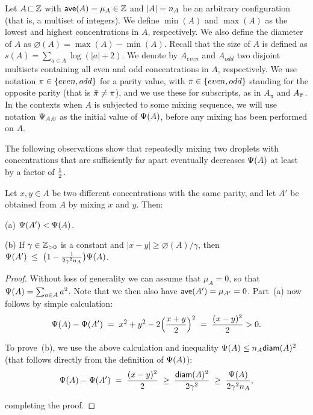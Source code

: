 
Let $A{\,\sqsubset\,}{\mathbb Z}$ with ${\textsf{ave}}(A)=\mu_A\in{\mathbb Z}$ and 
${|A|}=n_A$ be an arbitrary configuration (that is, a multiset of integers).
We define $\min(A)$ and $\max(A)$ as the lowest and highest concentrations in $A$, respectively.
We also define the diameter of $A$ as $\diameter(A) = \max(A) - \min(A)$.
Recall that the size of $A$ is defined as $s(A)=\sum_{a\in A} \log(|a|+2)$. 
We denote by $A_{even}$ and $A_{odd}$ two disjoint multisets containing
all even and odd concentrations in $A$, respectively.
We use notation $\pi\in{ \left\{ even,odd \right\} }$ for a parity value, with
${\bar{\pi}}\in{ \left\{ even,odd \right\} }$ standing for the opposite parity (that is ${\bar{\pi}}\neq\pi$),
and we use these for subscripts, as in  $A_\pi$ and $A_{{\bar{\pi}}}$.   
In the contexts when $A$ is subjected to some mixing sequence,
we will use notation ${\Psi}_{A,0}$ as the initial value of ${\Psi}(A)$,
before any mixing has been performed on $A$.

The following observations show that repeatedly mixing two droplets with concentrations 
that are sufficiently far apart eventually decreases ${\Psi}(A)$ at least by a factor of ${\textstyle\frac{1}{2}}$.


\begin{observation}\label{obs: far-appart mix}
Let $x,y\in A$ be two different concentrations with the same parity, and let $A'$ be
obtained from $A$ by mixing $x$ and $y$. Then:
%
\begin{description}
	
	\item{(a)} ${\Psi}(A') < {\Psi}(A)$.

	\item{(b)} If $\gamma\in{\mathbb{Z}_{> 0}}$ is a constant and
	$|x-y|\geq\diameter(A)/\gamma$, then
	${\Psi}(A') \;\leq\; \big(1 - \frac{1}{2\gamma^2n_A} \big){\Psi}(A)$.
	
\end{description}

\end{observation}

\begin{proof}
Without loss of generality we can assume that $\mu_A= 0$, so that ${\Psi}(A)=\sum_{a\in A}a^2$.
Note that we then also have ${\textsf{ave}}(A')=\mu_{A'} = 0$.
Part~(a) now follows by simple calculation:
%
	\begin{equation*}
			{\Psi}(A) - {\Psi}(A')
			\;=\; x^2+y^2-2\Big(\frac{x+y}{2}\Big)^2 
			\;=\; \frac{(x-y)^2}{2} > 0.
	\end{equation*}

\noindent
To prove~(b), we use the above calculation and inequality ${\Psi}(A)\le n_A {\textsf{diam}}(A)^2$
(that follows directly from the definition of ${\Psi}(A)$):
%
	\begin{equation*}
			{\Psi}(A) - {\Psi}(A')
			\;=\; \frac{(x-y)^2}{2} 
			\;\geq\; \frac{{\textsf{diam}}(A)^2}{2\gamma^2} 
			\;\geq\; \frac{{\Psi}(A)}{2\gamma^2n_A},
	\end{equation*}

\noindent
completing the proof.
\end{proof}



